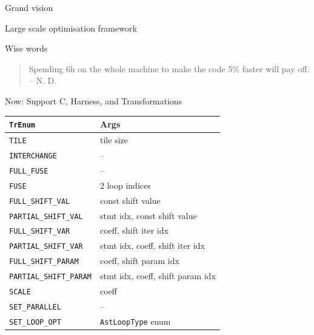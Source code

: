 \documentclass[presentation, aspectratio=169]{beamer}
\begin{document}
\begin{frame}[label={sec:org6dab10a}]{Grand vision}
\begin{block}{Large scale optimisation framework}
\begin{center}
\end{center}
\end{block}
\begin{block}{Wise words}
\begin{quote}
Spending 6h on the whole machine to make the code 5\% faster will pay off.  -- N. D.
\end{quote}
\end{block}
\end{frame}
\begin{frame}[label={sec:org351ec09},fragile]{Now: Support C, Harness, and Transformations}
 \begin{center}
\begin{tabular}{ll}
\texttt{TrEnum} & Args\\
\hline
\texttt{TILE} & tile size\\
\texttt{INTERCHANGE} & --\\
\texttt{FULL\_FUSE} & --\\
\texttt{FUSE} & 2 loop indices\\
\texttt{FULL\_SHIFT\_VAL} & const shift value\\
\texttt{PARTIAL\_SHIFT\_VAL} & stmt idx, const shift value\\
\texttt{FULL\_SHIFT\_VAR} & coeff, shift iter idx\\
\texttt{PARTIAL\_SHIFT\_VAR} & stmt idx, coeff, shift iter idx\\
\texttt{FULL\_SHIFT\_PARAM} & coeff, shift param idx\\
\texttt{PARTIAL\_SHIFT\_PARAM} & stmt idx, coeff, shift param idx\\
\texttt{SCALE} & coeff\\
\texttt{SET\_PARALLEL} & --\\
\texttt{SET\_LOOP\_OPT} & \texttt{AstLoopType} enum\\
\end{tabular}
\end{center}
\end{frame}
\end{document}
